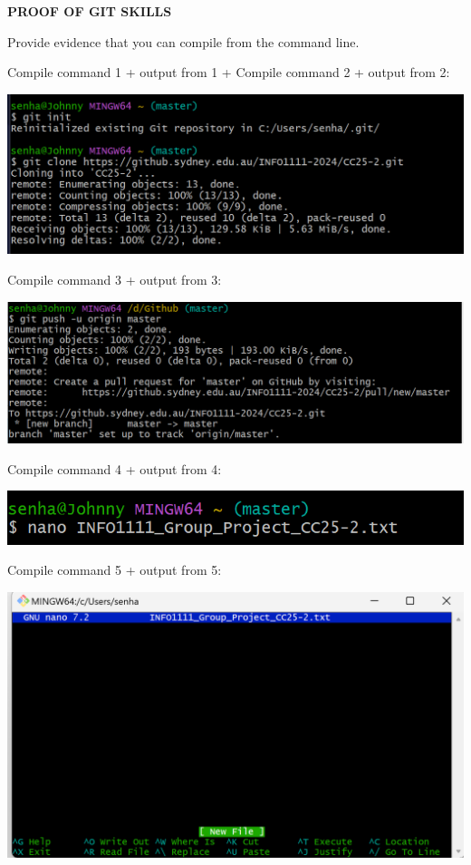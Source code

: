 \documentclass[a4paper, 11pt]{report}
\begin{document}
\textbf{PROOF OF GIT SKILLS}

Provide evidence that you can compile from the command line.

Compile command 1 + output from 1 + Compile command 2 + output from 2:

\includegraphics{graphic}

Compile command 3 + output from 3:

\includegraphics{graphic1}

Compile command 4 + output from 4:

\includegraphics{graphic2}

Compile command 5 + output from 5:

\includegraphics{graphic3}
\end{document}
